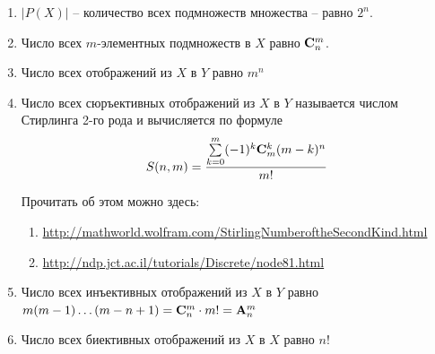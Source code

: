\begin{enumerate}
  \item $|P(X)|$ -- количество всех подмножеств множества -- равно $2^n$.
  \item Число всех $m$-элементных подмножеств в $X$ равно $\mathbf{C}^m_n$.
  \item Число всех отображений из $X$ в $Y$ равно $m^n$
  \item Число всех сюръективных отображений из $X$ в $Y$ называется числом Стирлинга 2-го рода и вычисляется по формуле 
  $$S(n,m) = \frac{\sum\limits_{k=0}^m (-1)^k \mathbf{C}_m^k (m-k)^n}{m!}$$

    Прочитать об этом можно здесь: 
    \begin{enumerate}
      \item \href{http://mathworld.wolfram.com/StirlingNumberoftheSecondKind.html}{http://mathworld.wolfram.com/StirlingNumberoftheSecondKind.html}
      \item \href{http://ndp.jct.ac.il/tutorials/Discrete/node81.html}{http://ndp.jct.ac.il/tutorials/Discrete/node81.html}
    \end{enumerate}
  \item Число всех инъективных отображений из $X$ в $Y$ равно $m(m-1)\dots(m-n+1)\bw=\Cb^m_n\cdot m!\bw=\Ab^m_n$
  \item Число всех биективных отображений из $X$ в $X$ равно $n!$
\end{enumerate}
